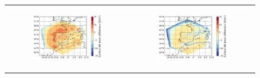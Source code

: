 \begin{figure}[htbp]
\begin{tabular}{cc}
        \begin{subfigure}[b]{0.33\textwidth}
            \caption{}
            \includegraphics[width=\textwidth]{images/chap4/forcing_sampling_freq/diff_map_LWdnSFC_era_era.png}
        \end{subfigure} &
        \begin{subfigure}[b]{0.33\textwidth}
            \caption{}
            \includegraphics[width=\textwidth]{images/chap4/forcing_sampling_freq/diff_map_LWdnSFC_ico_era.png}
        \end{subfigure} \\
    \end{tabular}
    \caption{}
    \label{fig:forcing_sampling_freq_ERA_diff_maps}
\end{figure}


